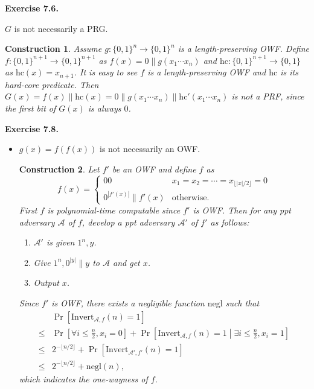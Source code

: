 \documentclass[a4paper]{article}
\newtheorem{construction}{Construction}
\newenvironment{exercise}[1]{
	\par
	\noindent\textbf{Exercise #1.}\quad
}{
	\par
	\bigskip
}
\newcommand{\sbra}[1]{\left[ #1 \right]}
\newcommand{\bin}{\{0,1\}}
\newcommand{\hc}{\mathrm{hc}}
\newcommand{\Invert}{\mathrm{Invert}}
\newcommand{\negl}{\mathrm{negl}}
\newcommand{\ppt}{{\sc ppt} }
\newcommand{\Acal}{\mathcal{A}}
\begin{document}
\begin{exercise}{7.6}
$G$ is not necessarily a PRG.
\begin{construction}
    Assume $g:\bin^n\to\bin^n$ is a length-preserving OWF.
    Define $f:\bin^{n+1}\to\bin^{n+1}$ as $f(x)=0\|g(x_1\cdots x_n)$ 
    and $\hc:\bin^{n+1}\to\bin$ as $\hc(x)=x_{n+1}$.
    It is easy to see $f$ is a length-preserving OWF and $\hc$ is its hard-core predicate. 
    Then $G(x)=f(x)\|\hc(x)=0\|g(x_1\cdots x_n)\|\hc'(x_1\cdots x_n)$ is not a PRF, since
    the first bit of $G(x)$ is always $0$.
\end{construction}
\end{exercise}

\begin{exercise}{7.8}
\begin{itemize}
    \item $g(x)=f(f(x))$ is not necessarily an OWF.
        \begin{construction}
            Let $f'$ be an OWF and define $f$ as 
            $$
            f(x)=\begin{cases}
                00 & x_1=x_2=\cdots=x_{\lfloor |x|/2\rfloor}=0\\
                0^{|f'(x)|}\|f'(x) & \text{otherwise}.
            \end{cases}
            $$
            First $f$ is polynomial-time computable since $f'$ is OWF.
            Then for any \ppt adversary $\Acal$ of $f$, develop a \ppt adversary $\Acal'$ of $f'$ as follows:
            \begin{enumerate}
                \item $\Acal'$ is given $1^n,y$.
                \item Give $1^n,0^{|y|}\|y$ to $\Acal$ and get $x$.
                \item Output $x$.
            \end{enumerate}
            Since $f'$ is OWF, there exists a negligible function $\negl$ such that
            \begin{align*}
                &\Pr\sbra{\Invert_{\Acal,f}(n)=1}\\
                \leq&\Pr\sbra{\forall i\leq\frac n 2,x_i=0}
                +\Pr\sbra{\Invert_{\Acal,f}(n)=1\middle| \exists i\leq\frac n 2,x_i=1}\\
                \leq&2^{-\lfloor n/2\rfloor}+\Pr\sbra{\Invert_{\Acal',f'}(n)=1}\\
                \leq&2^{-\lfloor n/2\rfloor}+\negl(n),
            \end{align*}
            which indicates the one-wayness of $f$.


\end{construction}
\end{itemize}
\end{exercise}
\end{document}
